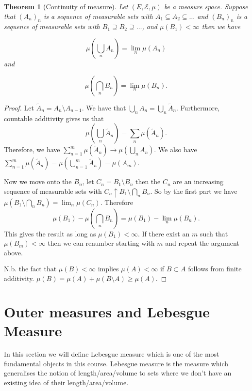 \documentclass[
]{book}
\newtheorem{theorem}{Theorem}[chapter]
\theoremstyle{definition}
\theoremstyle{definition}
\theoremstyle{definition}
\theoremstyle{definition}
\theoremstyle{remark}
\begin{document}
\begin{theorem}[Continuity of measure]
Let \((E, \mathcal{E}, \mu)\) be a measure space. Suppose that \((A_n)_n\) is a sequence of measurable sets with \(A_1 \subseteq A_2 \subseteq \dots\) and \((B_n)_n\) is a sequence of measurable sets with \(B_1 \supseteq B_2 \supseteq \dots\), and \(\mu(B_1)< \infty\) then we have

\[ \mu\left( \bigcup_n A_n\right) = \lim_n \mu(A_n) \]
and

\[ \mu\left( \bigcap_n B_n \right) = \lim_n \mu(B_n). \]
\end{theorem}

\begin{proof}
Let \(\tilde{A}_n = A_n \setminus A_{n-1}\). We have that \(\bigcup_n A_n = \bigcup_n \tilde{A}_n\). Furthermore, countable additivity gives us that
\[ \mu\left( \bigcup_n \tilde{A}_n \right) = \sum_n \mu(\tilde{A}_n). \] Therefore, we have \(\sum_{n=1}^m \mu(\tilde{A}_n) \rightarrow \mu \left( \bigcup_n A_n \right)\). We also have \(\sum_{n=1}^m \mu(\tilde{A}_n) = \mu \left( \bigcup_{n=1}^m \tilde{A}_n \right) = \mu (A_m)\).

Now we move onto the \(B_n\), let \(C_n = B_1 \setminus B_n\) then the \(C_n\) are an increasing sequence of measurable sets with \(C_n \uparrow B_1 \setminus \bigcap_n B_n\). So by the first part we have \(\mu\left(B_1 \setminus \bigcap_n B_n \right) = \lim_n \mu(C_n)\). Therefore
\[ \mu(B_1) - \mu\left( \bigcap_n B_n \right) = \mu(B_1) - \lim_n \mu(B_n). \] This gives the result as long as \(\mu(B_1) < \infty\). If there exist an \(m\) such that \(\mu(B_m) < \infty\) then we can renumber starting with \(m\) and repeat the argument above.

N.b. the fact that \(\mu(B)< \infty\) implies \(\mu(A)< \infty\) if \(B \subset A\) follows from finite additivity. \(\mu(B) = \mu(A) + \mu(B \setminus A) \geq \mu(A)\).
\end{proof}

\hypertarget{outer-measures-and-lebesgue-measure}{%
\chapter{Outer measures and Lebesgue Measure}\label{outer-measures-and-lebesgue-measure}}

In this section we will define Lebesgue measure which is one of the most fundamental objects in this course. Lebesgue measure is the measure which generalises the notion of length/area/volume to sets where we don't have an existing idea of their length/area/volume.
\end{document}
